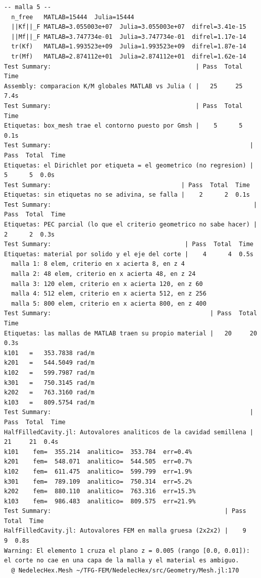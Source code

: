 \documentclass[12pt]{report} %
\begin{document}
\begin{lstlisting}[numbers=none, captionpos=b, caption={Salida completa de la suite de tests.}, label=cod:salida-tests]
-- malla 5 --
  n_free   MATLAB=15444  Julia=15444
  ||Kf||_F MATLAB=3.055003e+07  Julia=3.055003e+07  difrel=3.41e-15
  ||Mf||_F MATLAB=3.747734e-01  Julia=3.747734e-01  difrel=1.17e-14
  tr(Kf)   MATLAB=1.993523e+09  Julia=1.993523e+09  difrel=1.87e-14
  tr(Mf)   MATLAB=2.874112e+01  Julia=2.874112e+01  difrel=1.62e-14
Test Summary:                                        | Pass  Total  Time
Assembly: comparacion K/M globales MATLAB vs Julia ( |   25     25  7.4s
Test Summary:                                        | Pass  Total  Time
Etiquetas: box_mesh trae el contorno puesto por Gmsh |    5      5  0.1s
Test Summary:                                                       | Pass  Total  Time
Etiquetas: el Dirichlet por etiqueta = el geometrico (no regresion) |    5      5  0.0s
Test Summary:                                    | Pass  Total  Time
Etiquetas: sin etiquetas no se adivina, se falla |    2      2  0.1s
Test Summary:                                                        | Pass  Total  Time
Etiquetas: PEC parcial (lo que el criterio geometrico no sabe hacer) |    2      2  0.3s
Test Summary:                                     | Pass  Total  Time
Etiquetas: material por solido y el eje del corte |    4      4  0.5s
  malla 1: 8 elem, criterio en x acierta 8, en z 4
  malla 2: 48 elem, criterio en x acierta 48, en z 24
  malla 3: 120 elem, criterio en x acierta 120, en z 60
  malla 4: 512 elem, criterio en x acierta 512, en z 256
  malla 5: 800 elem, criterio en x acierta 800, en z 400
Test Summary:                                            | Pass  Total  Time
Etiquetas: las mallas de MATLAB traen su propio material |   20     20  0.3s
k101   =   353.7838 rad/m
k201   =   544.5049 rad/m
k102   =   599.7987 rad/m
k301   =   750.3145 rad/m
k202   =   763.3160 rad/m
k103   =   809.5754 rad/m
Test Summary:                                                       | Pass  Total  Time
HalfFilledCavity.jl: Autovalores analiticos de la cavidad semillena |   21     21  0.4s
k101    fem=  355.214  analitico=  353.784  err=0.4%
k201    fem=  548.071  analitico=  544.505  err=0.7%
k102    fem=  611.475  analitico=  599.799  err=1.9%
k301    fem=  789.109  analitico=  750.314  err=5.2%
k202    fem=  880.110  analitico=  763.316  err=15.3%
k103    fem=  986.483  analitico=  809.575  err=21.9%
Test Summary:                                                | Pass  Total  Time
HalfFilledCavity.jl: Autovalores FEM en malla gruesa (2x2x2) |    9      9  0.8s
Warning: El elemento 1 cruza el plano z = 0.005 (rango [0.0, 0.01]): el corte no cae en una capa de la malla y el material es ambiguo.
  @ NedelecHex.Mesh ~/TFG-FEM/NedelecHex/src/Geometry/Mesh.jl:170


\end{lstlisting}
\end{document}
